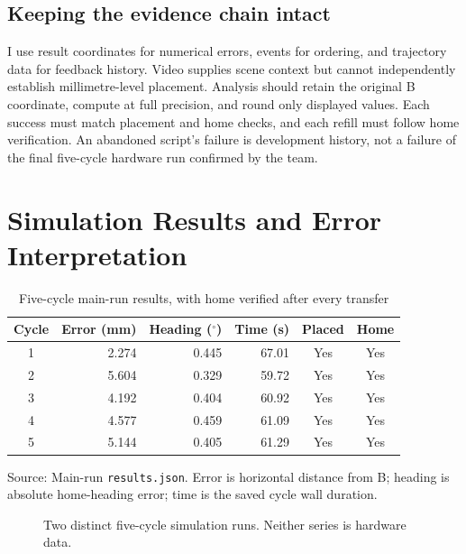 \documentclass[11pt,a4paper]{article}
\newcommand{\code}[1]{{\small\nolinkurl{#1}}}
\newcommand{\source}[1]{{\small\color{Muted}Source: #1}\par}
\begin{document}
\subsection{Keeping the evidence chain intact}
I use result coordinates for numerical errors, events for ordering, and
trajectory data for feedback history. Video supplies scene context but cannot
independently establish millimetre-level placement. Analysis should retain the
original B coordinate, compute at full precision, and round only displayed values.
Each success must match placement and home checks, and each refill must follow
home verification. An abandoned script's failure is development history, not a
failure of the final five-cycle hardware run confirmed by the team.
\clearpage

\section{Simulation Results and Error Interpretation}
\label{sec:results}
\begin{table}[H]
\centering
\caption{Five-cycle main-run results, with home verified after every transfer}
\begin{tabular}{@{}crrrcc@{}}
\toprule
Cycle & Error (mm) & Heading ($^\circ$) & Time (s) & Placed & Home\\\midrule
1 & 2.274 & 0.445 & 67.01 & Yes & Yes\\
2 & 5.604 & 0.329 & 59.72 & Yes & Yes\\
3 & 4.192 & 0.404 & 60.92 & Yes & Yes\\
4 & 4.577 & 0.459 & 61.09 & Yes & Yes\\
5 & 5.144 & 0.405 & 61.29 & Yes & Yes\\
\bottomrule
\end{tabular}
\end{table}
\source{Main-run \code{results.json}. Error is horizontal distance from B;
heading is absolute home-heading error; time is the saved cycle wall duration.}

\begin{figure}[H]
\centering
{}
\caption{Two distinct five-cycle simulation runs. Neither series is hardware data.}
\label{fig:errors}
\end{figure}
\end{document}
